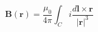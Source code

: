 \documentclass[border=2pt,varwidth]{standalone}
\begin{document}
\[
 \mathbf{B}(\mathbf{r}) = \frac{\mu_0}{4 \pi}
 \int_C i \frac{d\mathbf{l} \times \mathbf{r}}{|\mathbf{r}|^3}
\]
\end{document}
